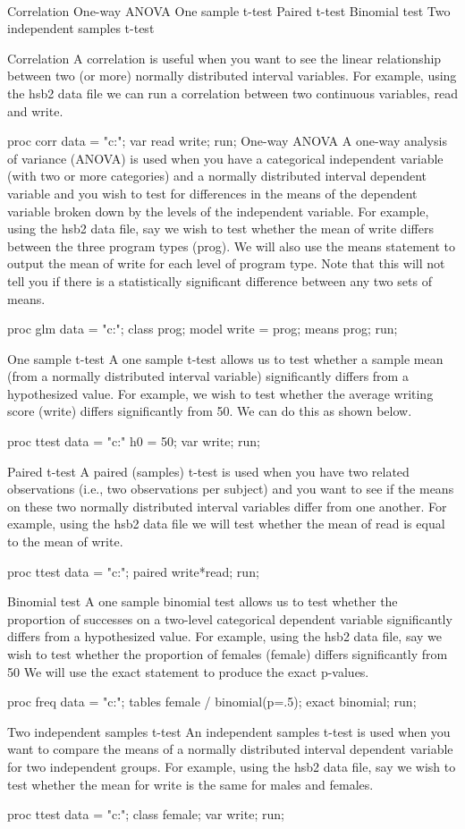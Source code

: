  

Correlation
One-way ANOVA
One sample t-test
Paired t-test
Binomial test
Two independent samples t-test
 
Correlation
A correlation is useful when you want to see the linear relationship between two (or more) normally distributed interval variables.  
For example, using the hsb2 data file we can run a correlation between two continuous variables, read and write. 
 
proc corr data = "c:\mydata{}";
  var read write;
run;
One-way ANOVA
A one-way analysis of variance (ANOVA) is used when you have a categorical independent variable (with two or more categories) and a normally distributed interval dependent variable and you wish to test for differences in the means of the dependent variable broken down by the levels of the independent variable. 
For example, using the hsb2 data file, say we wish to test whether the mean of write differs between the three program types (prog). 
We will also use the means statement to output the mean of write for each level of program type.  Note that this will not tell you if there is a statistically significant difference between any two sets of means.
 
proc glm data = "c:\mydata{}";
    class prog;
   model write = prog;  
   means prog;
run;
 
 
One sample t-test
A one sample t-test allows us to test whether a sample mean (from a normally distributed interval variable) significantly differs from a hypothesized value. 
For example, we wish to test whether the average writing score (write) differs significantly from 50.  We can do this as shown below.
 
proc ttest data = "c:\data" h0 = 50;  
     var write;
run;
 
Paired t-test
A paired (samples) t-test is used when you have two related observations (i.e., two observations per subject) and you want to see if the means on these two normally distributed interval variables differ from one another.  For example, using the hsb2 data file we will test whether the mean of read is equal to the mean of write.
 
proc ttest data = "c:\mydata{}";
  paired write*read;
run;
 
Binomial test
A one sample binomial test allows us to test whether the proportion of successes on a two-level categorical dependent variable significantly differs from a hypothesized value. 
For example, using the hsb2 data file, say we wish to test whether the proportion of females (female) differs significantly from 50%
We will use the exact statement to produce the exact p-values.
 
proc freq data = "c:\mydata{}";
  tables female / binomial(p=.5);
  exact binomial;
run;
 
Two independent samples t-test
An independent samples t-test is used when you want to compare the means of a normally distributed interval dependent variable for two independent groups. 
For example, using the hsb2 data file, say we wish to test whether the mean for write is the same for males and females.  
 
proc ttest data = "c:\mydata{}";
  class female;
  var write;
run;
